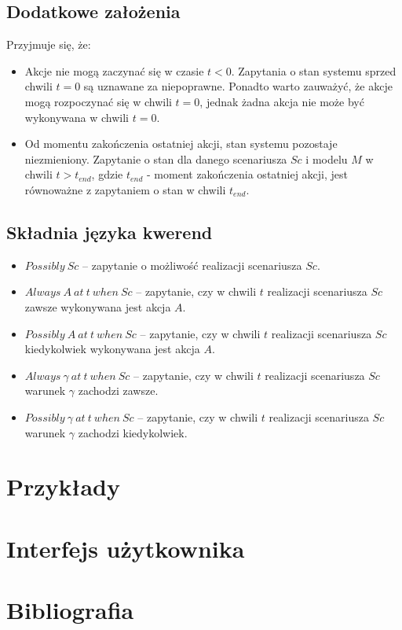 \documentclass{article}
\begin{document}
\subsection{Dodatkowe założenia}
Przyjmuje się, że:
\begin{itemize}
    \item Akcje nie mogą zaczynać się w czasie $t < 0$. Zapytania o stan systemu sprzed chwili $t = 0$ są uznawane za niepoprawne. Ponadto warto zauważyć, że akcje mogą rozpoczynać się w chwili $t = 0$, jednak żadna akcja nie może być wykonywana w chwili $t = 0$.
    \item Od momentu zakończenia ostatniej akcji, stan systemu pozostaje niezmieniony. Zapytanie o stan dla danego scenariusza $Sc$ i modelu $M$ w chwili $t > t_{end}$, gdzie $t_{end}$ - moment zakończenia ostatniej akcji, jest równoważne z zapytaniem o stan w chwili $t_{end}$.
\end{itemize}

\subsection{Składnia języka kwerend}
\begin{itemize}
    \item $Possibly\ Sc$ – zapytanie o możliwość realizacji scenariusza $Sc$.
    \item $Always\ A\ at\ t\ when\ Sc$ – zapytanie, czy w chwili $t$ realizacji scenariusza $Sc$ zawsze wykonywana jest akcja $A$.
    \item $Possibly\ A\ at\ t\ when\ Sc$ – zapytanie, czy w chwili $t$ realizacji scenariusza $Sc$ kiedykolwiek wykonywana jest akcja $A$.
    \item $Always\ \gamma\ at\ t\ when\ Sc$ – zapytanie, czy w chwili $t$ realizacji scenariusza $Sc$ warunek $\gamma$ zachodzi zawsze.
    \item $Possibly\ \gamma\ at\ t\ when\ Sc$ – zapytanie, czy w chwili $t$ realizacji scenariusza $Sc$ warunek $\gamma$ zachodzi kiedykolwiek.
\end{itemize}

\section{Przykłady}

\section{Interfejs użytkownika}

\section{Bibliografia}
\end{document}
